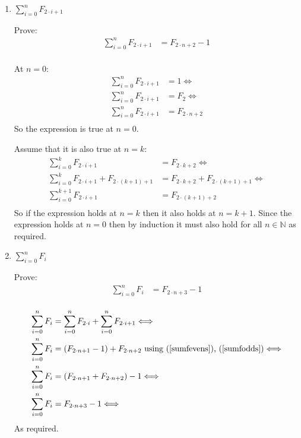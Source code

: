 \documentclass[10pt,\jkfside,a4paper]{article}
\begin{document}
\begin{enumerate}
\begin{enumerate}
\begin{enumerate}[label = (\roman*)]
\item $\sum^n_{i = 0}F_{2 \cdot i + 1}$

Prove:
\begin{equation}\label{sumfodds}
\begin{split}
\sum^n_{i = 0} F_{2 \cdot i + 1} &= F_{2 \cdot n + 2} - 1\\
\end{split}
\end{equation}

At $n = 0$:
\begin{equation}
\begin{split}
\sum^n_{i = 0} F_{2 \cdot i + 1} &= 1 \Longleftrightarrow\\
\sum^n_{i = 0} F_{2 \cdot i + 1} &= F_2 \Longleftrightarrow\\
\sum^n_{i = 0} F_{2 \cdot i + 1} &= F_{2\cdot n + 2} \\
\end{split}
\end{equation}
So the expression is true at $n = 0$.

Assume that it is also true at $n = k$:
\begin{equation}
\begin{split}
\sum^k_{i = 0} F_{2 \cdot i + 1} &= F_{2 \cdot k + 2} \Longleftrightarrow\\
\sum^k_{i = 0} F_{2 \cdot i + 1} + F_{2\cdot (k + 1) + 1} &= F_{2 \cdot k + 2} + F_{2\cdot (k + 1) + 1}\Longleftrightarrow\\
\sum^{k + 1}_{i = 0} F_{2 \cdot i + 1} &= F_{2 \cdot (k + 1) + 2}\\
\end{split}
\end{equation}
So if the expression holds at $n = k$ then it also holds at $n = k + 1$. Since the expression holds at $n = 0$ then 
by induction it must also hold for all $n \in \mathbb{N}$ as required.

\item $\sum^n_{i = 0} F_i$

Prove:
\begin{equation}
\begin{split}
\sum^n_{i = 0} F_i &= F_{2\cdot n + 3} - 1\\
\end{split}
\end{equation}

\begin{equation}
\begin{split}
\sum^n_{i = 0} F_i &= \sum^n_{i = 0} F_{2 \cdot i} + \sum^n_{i = 0} F_{2 \cdot i + 1} \Longleftrightarrow\\
\sum^n_{i = 0} F_i &= (F_{2 \cdot n + 1} - 1) + F_{2 \cdot n + 2} \text{ using (\ref{sumfevens}), (\ref{sumfodds})}\Longleftrightarrow\\
\sum^n_{i = 0} F_i &= (F_{2 \cdot n + 1} + F_{2 \cdot n + 2}) - 1 \Longleftrightarrow\\
\sum^n_{i = 0} F_i &= F_{2 \cdot n + 3} - 1 \Longleftrightarrow\\
\end{split}
\end{equation}
As required.


\end{enumerate}
\end{enumerate}
\end{enumerate}
\end{document}
